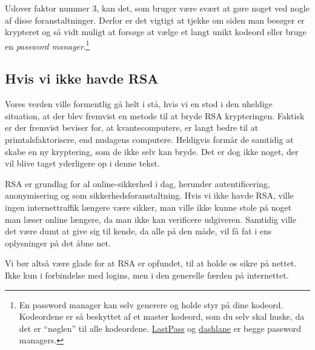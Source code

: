 Udover faktor nummer 3, kan det, som bruger være svært at gøre noget ved nogle af disse foranstaltninger.
Derfor er det vigtigt at tjekke om siden man besøger er krypteret og så vidt muligt at forsøge at vælge et langt unikt kodeord eller bruge en \emph{password manager}.\footnote{En password manager kan selv generere og holde styr på dine kodeord. Kodeordene er så beskyttet af et master kodeord, som du selv skal huske, da det er ``nøglen'' til alle kodeordene. \href{https://www.lastpass.com/}{LastPass} og \href{https://www.dashlane.com/}{dashlane} er begge password managers.}

\subsection{Hvis vi ikke havde RSA}
Vores verden ville formentlig gå helt i stå, hvis vi en stod i den uheldige situation, at der blev fremvist en metode til at bryde RSA krypteringen.
Faktisk er der fremvist beviser for, at kvantecomputere, er langt bedre til at primtalsfaktorisere, end nudagens computere.\cite{quantum}
Heldigvis formår de samtidig at skabe en ny kryptering, som de ikke selv kan bryde.
Det er dog ikke noget, der vil blive taget yderligere op i denne tekst.

RSA er grundlag for al online-sikkerhed i dag, herunder autentificering, anonymisering og som sikkerhedsforanstaltning.
Hvis vi ikke havde RSA, ville ingen internettraffik længere være sikker, man ville ikke kunne stole på noget man læser online længere, da man ikke kan verificere udgiveren.
Samtidig ville det være dumt at give sig til kende, da alle på den måde, vil få fat i ens oplysninger på det åbne net.

Vi bør altså være glade for at RSA er opfundet, til at holde os sikre på nettet. Ikke kun i forbindelse med logins, men i den generelle færden på internettet.
